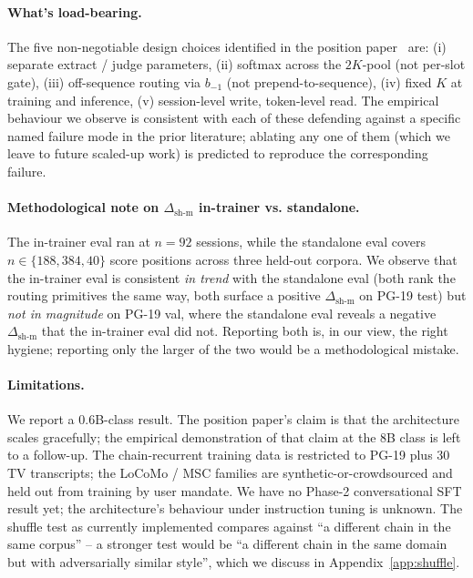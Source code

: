 \documentclass{article}
\newcommand{\dsh}{\Delta_{\text{sh-m}}}
\begin{document}
\paragraph{What's load-bearing.}
The five non-negotiable design choices identified in the position
paper~\cite{liu2025memres} are: (i) separate extract / judge
parameters, (ii) softmax across the $2K$-pool (not per-slot gate),
(iii) off-sequence routing via $b_{-1}$ (not prepend-to-sequence),
(iv) fixed $K$ at training and inference, (v) session-level write,
token-level read. The empirical behaviour we observe is consistent
with each of these defending against a specific named failure mode
in the prior literature; ablating any one of them (which we leave to
future scaled-up work) is predicted to reproduce the corresponding
failure.

\paragraph{Methodological note on $\dsh$ in-trainer vs. standalone.}
The in-trainer eval ran at $n = 92$ sessions, while the standalone
eval covers $n \in \{188, 384, 40\}$ score positions across three
held-out corpora. We observe that the in-trainer eval is consistent
\emph{in trend} with the standalone eval (both rank the routing
primitives the same way, both surface a positive $\dsh$ on PG-19
test) but \emph{not in magnitude} on PG-19 val, where the
standalone eval reveals a negative $\dsh$ that the in-trainer eval
did not. Reporting both is, in our view, the right hygiene; reporting
only the larger of the two would be a methodological mistake.

\paragraph{Limitations.}
\label{sec:limits}
We report a 0.6B-class result. The position paper's claim is that
the architecture scales gracefully; the empirical demonstration of
that claim at the 8B class is left to a follow-up. The chain-recurrent
training data is restricted to PG-19 plus 30 TV transcripts; the
LoCoMo / MSC families are synthetic-or-crowdsourced and held out
from training by user mandate. We have no Phase-2 conversational SFT
result yet; the architecture's behaviour under instruction tuning is
unknown. The shuffle test as currently implemented compares against
``a different chain in the same corpus'' -- a stronger test would be
``a different chain in the same domain but with adversarially
similar style'', which we discuss in Appendix~\ref{app:shuffle}.
\end{document}
